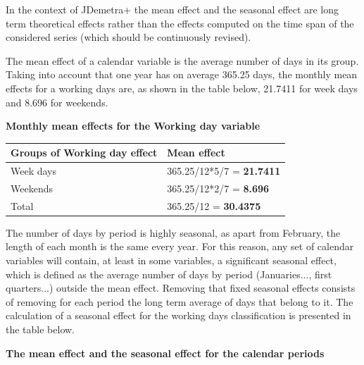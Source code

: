\documentclass[
  letterpaper,
  DIV=11,
  numbers=noendperiod]{scrreprt}
\begin{document}
In the context of JDemetra+ the mean effect and the seasonal effect are
long term theoretical effects rather than the effects computed on the
time span of the considered series (which should be continuously
revised).

The mean effect of a calendar variable is the average number of days in
its group. Taking into account that one year has on average 365.25 days,
the monthly mean effects for a working days are, as shown in the table
below, 21.7411 for week days and 8.696 for weekends.

\textbf{Monthly mean effects for the Working day variable}

\begin{longtable}[]{@{}ll@{}}
\toprule()
\textbf{Groups of Working day effect} & \textbf{Mean effect} \\
\midrule()
\endhead
Week days & 365.25/12*5/7 = \textbf{21.7411} \\
Weekends & 365.25/12*2/7 = \textbf{8.696} \\
Total & 365.25/12 = \textbf{30.4375} \\
\bottomrule()
\end{longtable}

The number of days by period is highly seasonal, as apart from February,
the length of each month is the same every year. For this reason, any
set of calendar variables will contain, at least in some variables, a
significant seasonal effect, which is defined as the average number of
days by period (Januaries..., first quarters...) outside the mean
effect. Removing that fixed seasonal effects consists of removing for
each period the long term average of days that belong to it. The
calculation of a seasonal effect for the working days classification is
presented in the table below.

\textbf{The mean effect and the seasonal effect for the calendar
periods}
\end{document}
